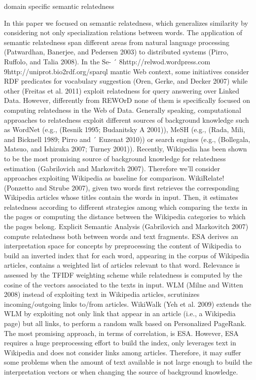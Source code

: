 \cite{aaai/StrubeP06}
\cite{ijcai/GabrilovichM07}
\cite{www/RadinskyAGM11}

\cite{aaai/Pirro12}
\cite{aaai/NavigliP12}

\cite{acl/IacobacciPN15}

\cite{ijcai/SenJHMOMVWH15} domain specific semantic relatedness 


In this paper we focused on semantic relatedness, which
generalizes similarity by considering not only specialization
relations between words. The application of semantic
relatedness span different areas from natural language processing
(Patwardhan, Banerjee, and Pedersen 2003) to distributed
systems (Pirro, Ruffolo, and Talia 2008). In the Se- ´
8http://relwod.wordpress.com
9http://uniprot.bio2rdf.org/sparql
mantic Web context, some initiatives consider RDF predicates
for vocabulary suggestion (Oren, Gerke, and Decker
2007) while other (Freitas et al. 2011) exploit relatedness
for query answering over Linked Data. However, differently
from REWOrD none of them is specifically focused on computing
relatedness in the Web of Data.
Generally speaking, computational approaches to relatedness
exploit different sources of background knowledge
such as WordNet (e.g., (Resnik 1995; Budanitsky A 2001)),
MeSH (e.g., (Rada, Mili, and Bicknell 1989; Pirro and ´
Euzenat 2010)) or search engines (e.g., (Bollegala, Matsuo,
and Ishizuka 2007; Turney 2001)). Recently, Wikipedia
has been shown to be the most promising source of background
knowledge for relatedness estimation (Gabrilovich
and Markovitch 2007). Therefore we’ll consider approaches
exploiting Wikipedia as baseline for comparison.
WikiRelate! (Ponzetto and Strube 2007), given two words
first retrieves the corresponding Wikipedia articles whose titles
contain the words in input. Then, it estimates relatedness
according to different strategies among which comparing
the texts in the pages or computing the distance between
the Wikipedia categories to which the pages belong.
Explicit Semantic Analysis (Gabrilovich and Markovitch
2007) compute relatedness both between words and text
fragments. ESA derives an interpretation space for concepts
by preprocessing the content of Wikipedia to build
an inverted index that for each word, appearing in the corpus
of Wikipedia articles, contains a weighted list of articles
relevant to that word. Relevance is assessed by the
TFIDF weighting scheme while relatedness is computed by
the cosine of the vectors associated to the texts in input.
WLM (Milne and Witten 2008) instead of exploiting text
in Wikipedia articles, scrutinizes incoming/outgoing links
to/from articles. WikiWalk (Yeh et al. 2009) extends the
WLM by exploiting not only link that appear in an article
(i.e., a Wikipedia page) but all links, to perform a random
walk based on Personalized PageRank.
The most promising approach, in terms of correlation, is
ESA. However, ESA requires a huge preprocessing effort to
build the index, only leverages text in Wikipedia and does
not consider links among articles. Therefore, it may suffer
some problems when the amount of text available is not large
enough to build the interpretation vectors or when changing
the source of background knowledge.